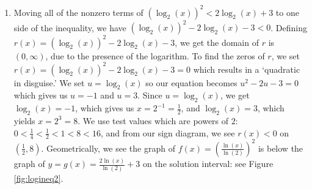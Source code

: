 {\begin{enumerate}
\item  Moving all of the nonzero terms of  $\left(\log_{2}(x)\right)^2 < 2 \log_{2}(x) + 3$ to one side of the inequality, we have $\left(\log_{2}(x)\right)^2 - 2 \log_{2}(x) - 3 < 0$. Defining $r(x) = \left(\log_{2}(x)\right)^2 - 2 \log_{2}(x) - 3$, we get the domain of $r$ is $(0, \infty)$, due to the presence of the logarithm.  To find the zeros of $r$, we set $r(x) =\left(\log_{2}(x)\right)^2 - 2 \log_{2}(x) - 3= 0$ which results in a `quadratic in disguise.'  We set $u = \log_{2}(x)$ so our equation becomes $u^2-2u-3 = 0$ which gives us $u=-1$ and $u=3$.  Since $u = \log_{2}(x)$, we get $\log_{2}(x) = -1$, which gives us $x = 2^{-1} = \frac{1}{2}$, and $\log_{2}(x) = 3$, which yields $x = 2^{3} = 8$.  We use test values which are powers of $2$: $0 < \frac{1}{4} < \frac{1}{2} < 1 < 8 < 16$, and from our sign diagram, we see $r(x)< 0$ on $\left(\frac{1}{2}, 8 \right)$. Geometrically, we see the graph of $f(x)= \left(\frac{\ln(x)}{\ln(2)}\right)^2$ is below  the graph of $y = g(x) = \frac{2 \ln(x)}{\ln(2)} + 3$ on the solution interval: see Figure \ref{fig:logineq2}.

{}



\end{enumerate}}
